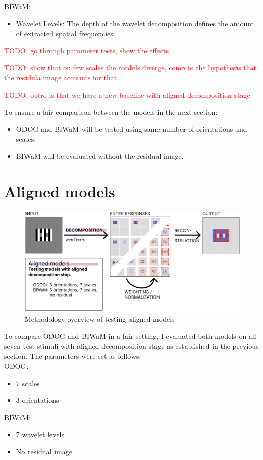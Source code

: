 BIWaM:
\begin{itemize} 
    \item Wavelet Levels: The depth of the wavelet decomposition defines the
    amount of extracted spatial frequencies.
\end{itemize}

\textcolor{red}{TODO: go through parameter tests, show the effects}

\textcolor{red}{TODO: show that on few scales the models diverge, come to the hypothesis 
that the residula image accounts for that}

\textcolor{red}{TODO: outro is that we have a new baseline with aligned decomposition stage}

To ensure a fair comparison between the models in the next section:
\begin{itemize} 
    \item ODOG and BIWaM will be tested using same number of orientations and scales.
    \item BIWaM will be evaluated without the residual image.
\end{itemize}

\newpage
\section{Aligned models}

\begin{figure}[H]
    \centering
    \includegraphics[width=\linewidth]{media/methodology/aligned_overview.png}
    \begin{minipage}{0.8\textwidth}
    \caption{Methodology overview of testing aligned models}
    \label{fig:figure12}
    \end{minipage}
\end{figure}

To compare ODOG and BIWaM in a fair setting, I evaluated both models on all seven test
stimuli with aligned decomposition stage as established in the previous section. The
parameters were set as follows: \\
ODOG:
\begin{itemize} 
    \item 7 scales
    \item 3 orientations
\end{itemize}
BIWaM:
\begin{itemize} 
    \item 7 wavelet levels
    \item No residual image
\end{itemize}

